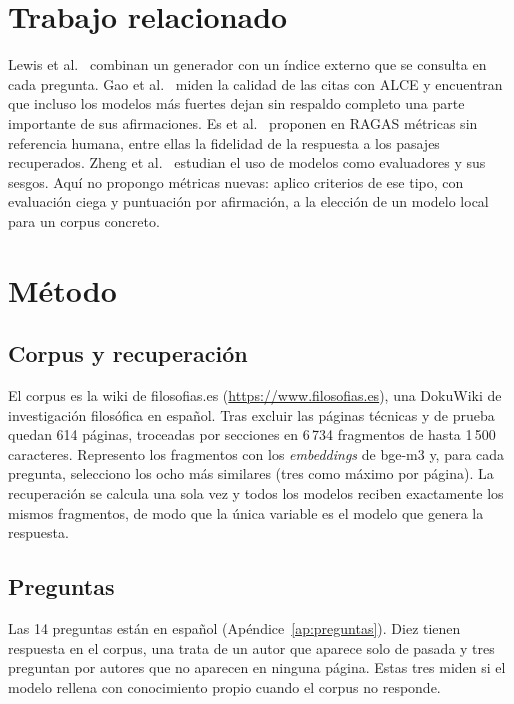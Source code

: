 \documentclass{article}
\begin{document}
\section{Trabajo relacionado}

Lewis et al.\ \citep{lewis2020rag} combinan un generador con un índice
externo que se consulta en cada pregunta. Gao et al.\ \citep{gao2023alce}
miden la calidad de las citas con ALCE y encuentran que incluso los modelos
más fuertes dejan sin respaldo completo una parte importante de sus
afirmaciones. Es et al.\ \citep{es2023ragas} proponen en RAGAS métricas sin
referencia humana, entre ellas la fidelidad de la respuesta a los pasajes
recuperados. Zheng et al.\ \citep{zheng2023judge} estudian el uso de modelos
como evaluadores y sus sesgos. Aquí no propongo métricas nuevas: aplico
criterios de ese tipo, con evaluación ciega y puntuación por afirmación, a
la elección de un modelo local para un corpus concreto.

\section{Método}

\subsection{Corpus y recuperación}

El corpus es la wiki de filosofias.es (\url{https://www.filosofias.es}),
una DokuWiki de investigación filosófica en español. Tras excluir las
páginas técnicas y de prueba quedan 614 páginas, troceadas por secciones en
6\,734 fragmentos de hasta 1\,500
caracteres. Represento los fragmentos con los \emph{embeddings} de bge-m3
\citep{chen2024m3} y, para cada pregunta, selecciono los ocho más similares
(tres como máximo por página). La recuperación se calcula una sola vez y
todos los modelos reciben exactamente los mismos fragmentos, de modo que la
única variable es el modelo que genera la respuesta.

\subsection{Preguntas}

Las 14 preguntas están en español (Apéndice~\ref{ap:preguntas}). Diez tienen
respuesta en el corpus, una trata de un autor que aparece solo de pasada y
tres preguntan por autores que no aparecen en ninguna página. Estas tres
miden si el modelo rellena con conocimiento propio cuando el corpus no
responde.
\end{document}

